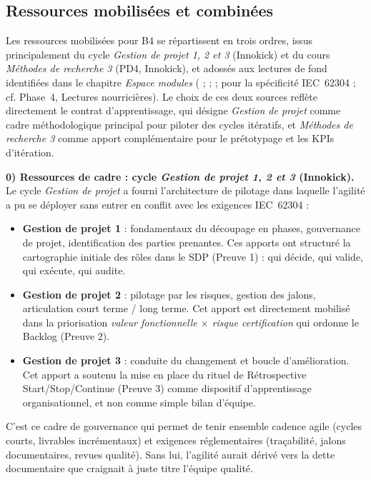 \subsection{Ressources mobilisées et combinées}

Les ressources mobilisées pour B4 se répartissent en trois ordres, issus principalement du cycle \textit{Gestion de projet 1, 2 et 3} (Innokick) et du cours \textit{Méthodes de recherche 3} (PD4, Innokick), et adossés aux lectures de fond identifiées dans le chapitre \textit{Espace modules} (\citealp{sutherland2014} ; \citealp{poppendieck2003} ; \citealp{humble2010} ; \citealp{mchugh2014} pour la spécificité IEC~62304 ; cf. Phase~4, Lectures nourricières). Le choix de ces deux sources reflète directement le contrat d'apprentissage, qui désigne \textit{Gestion de projet} comme cadre méthodologique principal pour piloter des cycles itératifs, et \textit{Méthodes de recherche 3} comme apport complémentaire pour le prétotypage et les KPIs d'itération.

\medskip

\textbf{0) Ressources de cadre : cycle \textit{Gestion de projet 1, 2 et 3} (Innokick).}
Le cycle \textit{Gestion de projet} a fourni l'architecture de pilotage dans laquelle l'agilité a pu se déployer sans entrer en conflit avec les exigences IEC~62304 :

\begin{itemize}
  \item \textbf{Gestion de projet 1} : fondamentaux du découpage en phases, gouvernance de projet, identification des parties prenantes. Ces apports ont structuré la cartographie initiale des rôles dans le SDP (Preuve 1) : qui décide, qui valide, qui exécute, qui audite.
  \item \textbf{Gestion de projet 2} : pilotage par les risques, gestion des jalons, articulation court terme / long terme. Cet apport est directement mobilisé dans la priorisation \emph{valeur fonctionnelle $\times$ risque certification} qui ordonne le Backlog (Preuve 2).
  \item \textbf{Gestion de projet 3} : conduite du changement et boucle d'amélioration. Cet apport a soutenu la mise en place du rituel de Rétrospective Start/Stop/Continue (Preuve 3) comme dispositif d'apprentissage organisationnel, et non comme simple bilan d'équipe.
\end{itemize}

C'est ce cadre de gouvernance qui permet de tenir ensemble cadence agile (cycles courts, livrables incrémentaux) et exigences réglementaires (traçabilité, jalons documentaires, revues qualité). Sans lui, l'agilité aurait dérivé vers la dette documentaire que craignait à juste titre l'équipe qualité.

